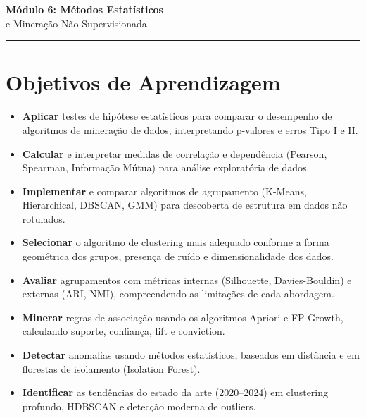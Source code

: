 \documentclass[12pt,a4paper]{article}
\begin{document}
\begin{center}
  {\LARGE\bfseries\color{mineblue} Módulo 6: Métodos Estatísticos}\\[0.4em]
  {\large\color{mineorange} e Mineração Não-Supervisionada}\\[0.6em]
  \rule{\linewidth}{0.8pt}
\end{center}

\section{Objetivos de Aprendizagem}

\begin{itemize}[leftmargin=2em]
  \item[\faIcon{check-circle}] \textbf{Aplicar} testes de hipótese estatísticos para comparar o desempenho de algoritmos de mineração de dados, interpretando p-valores e erros Tipo I e II.
  \item[\faIcon{check-circle}] \textbf{Calcular} e interpretar medidas de correlação e dependência (Pearson, Spearman, Informação Mútua) para análise exploratória de dados.
  \item[\faIcon{check-circle}] \textbf{Implementar} e comparar algoritmos de agrupamento (K-Means, Hierarchical, DBSCAN, GMM) para descoberta de estrutura em dados não rotulados.
  \item[\faIcon{check-circle}] \textbf{Selecionar} o algoritmo de clustering mais adequado conforme a forma geométrica dos grupos, presença de ruído e dimensionalidade dos dados.
  \item[\faIcon{check-circle}] \textbf{Avaliar} agrupamentos com métricas internas (Silhouette, Davies-Bouldin) e externas (ARI, NMI), compreendendo as limitações de cada abordagem.
  \item[\faIcon{check-circle}] \textbf{Minerar} regras de associação usando os algoritmos Apriori e FP-Growth, calculando suporte, confiança, lift e conviction.
  \item[\faIcon{check-circle}] \textbf{Detectar} anomalias usando métodos estatísticos, baseados em distância e em florestas de isolamento (Isolation Forest).
  \item[\faIcon{check-circle}] \textbf{Identificar} as tendências do estado da arte (2020--2024) em clustering profundo, HDBSCAN e detecção moderna de outliers.
\end{itemize}
\end{document}
